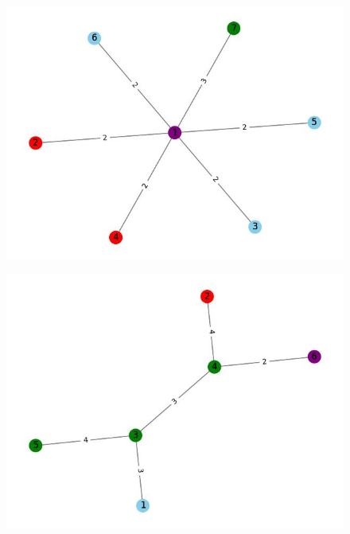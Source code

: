 \documentclass{article}
\begin{document}
\begin{figure}
    \centering
    \includegraphics[width=1\linewidth]{2.jpg}
    \label{fig:enter-label}
\end{figure}

\begin{figure}
    \centering
    \includegraphics[width=1\linewidth]{3.jpg}
    \label{fig:enter-label}
\end{figure}
\end{document}
